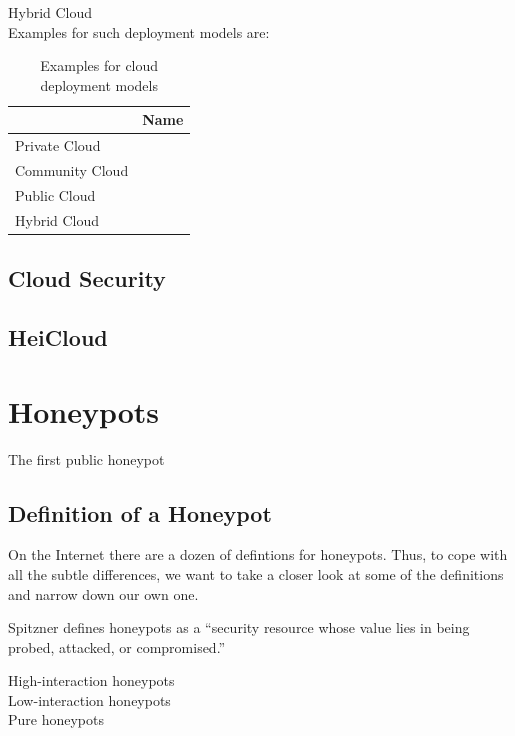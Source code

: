 Hybrid Cloud\\

Examples for such deployment models are:
\begin{table}[]
    \centering
    \caption{Examples for cloud deployment models}
    \begin{tabular}{|l|l|}
        \hline
                        & Name \\ \hline
        Private Cloud   &      \\ \hline
        Community Cloud &      \\ \hline
        Public Cloud    &      \\ \hline
        Hybrid Cloud    &      \\ \hline
    \end{tabular}
\end{table}

\subsection{Cloud Security}

\cite{Nithin2012}

\subsection{HeiCloud}

\section{Honeypots}

The first public honeypot \cite{Spitzner2003}

\subsection{Definition of a Honeypot}

On the Internet there are a dozen of defintions for honeypots. Thus, to cope with all the subtle differences, we want to take a closer look at some of the definitions and narrow down our own one.

Spitzner defines honeypots as a \enquote{security resource whose value lies in being probed, attacked, or compromised.}\cite{Spitzner2003}

High-interaction honeypots\\

Low-interaction honeypots\\

Pure honeypots\\

